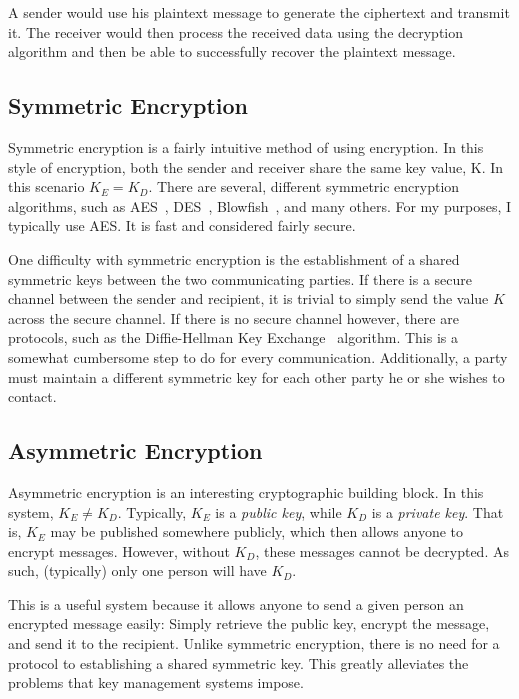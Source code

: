 A sender would use his plaintext message to generate the ciphertext and transmit it. The receiver would then process the received data using the decryption
algorithm and then be able to successfully recover the plaintext message.

\subsection{Symmetric Encryption}
Symmetric encryption is a fairly intuitive method of using encryption. In this style of encryption,
both the sender and receiver share the same key value, K. In this scenario $K_E = K_D$. There are several,
different symmetric encryption algorithms, such as AES~\cite{AES}, DES~\cite{DES}, Blowfish~\cite{Blowfish}, and many others.
For my purposes, I typically use AES. It is fast and considered fairly secure.

One difficulty with symmetric encryption is the establishment of a shared symmetric keys between the two communicating parties.
If there is a secure channel between the sender and recipient, it is trivial to simply send the value $K$ across the secure channel.
If there is no secure channel however, there are protocols, such as the Diffie-Hellman Key Exchange~\cite{diffiehellmankeyexchange} algorithm.
This is a somewhat cumbersome step to do for every communication. Additionally, a party must maintain a different symmetric key for each
other party he or she wishes to contact.

\subsection{Asymmetric Encryption}
Asymmetric encryption is an interesting cryptographic building block. In this system, $K_E \neq K_D$. Typically,
$K_E$ is a \emph{public key}, while $K_D$ is a \emph{private key}. That is, $K_E$ may be published somewhere publicly,
which then allows anyone to encrypt messages. However, without $K_D$, these messages cannot be decrypted. As such, (typically) only one person
will have $K_D$. 

This is a useful system because it allows anyone to send a given person an encrypted message easily: Simply retrieve the public key,
encrypt the message, and send it to the recipient. Unlike symmetric encryption, there is no need for a protocol to establishing a shared symmetric
key. This greatly alleviates the problems that key management systems impose.


